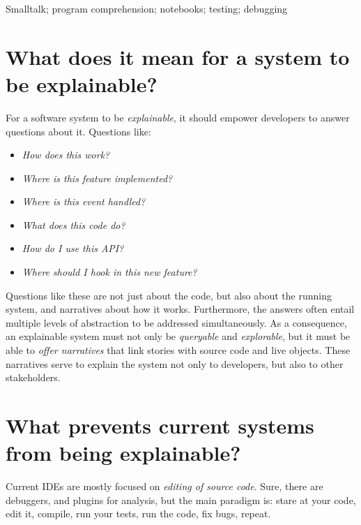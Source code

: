 \documentclass[conference]{IEEEtran}
\newcommand\tg[1]{\nbc{TG}{#1}{orange}} %
\newcommand\pr[1]{\nbc{PR}{#1}{olive}} %
\begin{document}
\begin{IEEEkeywords}
Smalltalk; program comprehension; notebooks; testing; debugging
\end{IEEEkeywords}

\section*{What does it mean for a system to be explainable?}

For a software system to be \emph{explainable}, it should empower developers to answer questions about it.
Questions like:
\begin{itemize}[--]
\item \emph{How does this work?}
\item \emph{Where is this feature implemented?}
\item \emph{Where is this event handled?}
\item \emph{What does this code do?}
\item \emph{How do I use this API?}
\item \emph{Where should I hook in this new feature?}
\end{itemize}


Questions like these are not just about the code, but also about the running system, and narratives about how it works.
Furthermore, the answers often entail multiple levels of abstraction to be addressed simultaneously.
As a consequence, an explainable system must not only be \emph{queryable} and \emph{explorable}, but it must be able to \emph{offer narratives} that link stories with source code and live objects.
These narratives serve to explain the system not only to developers, but also to other stakeholders.

\section*{What prevents current systems from being explainable?}

Current IDEs are mostly focused on \emph{editing of source code}.
Sure, there are debuggers, and plugins for analysis, but the main paradigm is: stare at your code, edit it, compile, run your tests, run the code, fix bugs, repeat.
\end{document}
